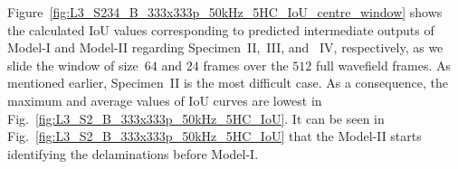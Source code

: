 \begin{sloppypar}
%	
%	
%	
%	
	Figure~\ref{fig:L3_S234_B_333x333p_50kHz_5HC_IoU_centre_window} shows the calculated IoU values corresponding to predicted intermediate outputs of Model-I and Model-II regarding Specimen~II,~III, and ~IV, respectively, as we slide the window of size~\(64\) and \(24\) frames over the \(512\) full wavefield frames.
	As mentioned earlier, Specimen~II is the most difficult case.
	As a consequence, the maximum and average values of IoU curves are lowest in Fig.~\ref{fig:L3_S2_B_333x333p_50kHz_5HC_IoU}. 
	It can be seen in Fig.~\ref{fig:L3_S2_B_333x333p_50kHz_5HC_IoU} that the Model-II starts identifying the delaminations before Model-I.

\end{sloppypar}
